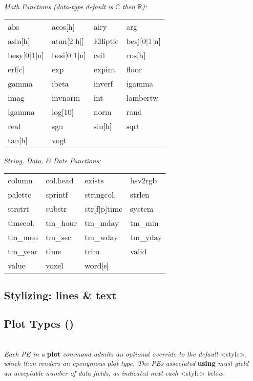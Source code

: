 \textit{Math Functions (data-type default is $\mathbb{C}$ then $\mathbb{R}$):}\\
{\footnotesize
\begin{tabular}{l l l l}
    abs         & acos[h]       & airy      & arg       \\
    asin[h]     & atan[2|h|]    & Elliptic  & besj[0|1|n]       \\
    besy[0|1|n] & besi[0|1|n]   & ceil      & cos[h]    \\
    erf[c]      & exp           & expint    & floor     \\
    gamma       & ibeta         & inverf    & igamma    \\
    imag        & invnorm       & int       & lambertw  \\
    lgamma      & log[10]       & norm      & rand      \\
    real        & sgn           & sin[h]    & sqrt      \\
    tan[h]      & vogt
\end{tabular}}\vspace{2mm}

\textit{String, Data, \& Date Functions:}\\
{\footnotesize
\begin{tabular}{l l l l}
    column          & col.head      & exists        & hsv2rgb       \\
    palette         & sprintf       & stringcol.    & strlen        \\
    strstrt         & substr        & str[f|p]time  & system        \\
    timecol.        & tm\_hour      & tm\_mday      & tm\_min       \\
    tm\_mon         & tm\_sec       & tm\_wday      & tm\_yday      \\
    tm\_year        & time          & trim          & valid         \\
    value           & voxel         & word[s]       \\
\end{tabular}}


\subsection*{Stylizing: lines \& text}


\subsection*{Plot Types ()}
\\
\textit{Each PE in a }\textbf{plot}\textit{ command admits an optional override to the default }<style>\textit{, which then renders an eponymous plot type. The PE\textquotesingle s associated }\textbf{using}\textit{ must yield an acceptable number of data fields, as indicated next each }<style>\textit{ below.}

